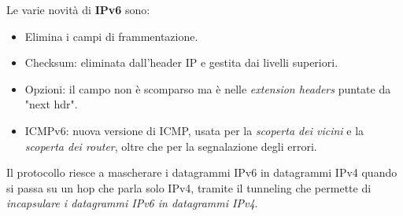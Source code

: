 Le varie novità di \textbf{IPv6} sono:
\begin{itemize}
  \item Elimina i campi di frammentazione.
  \item Checksum: eliminata dall'header IP e gestita dai livelli superiori.
  \item Opzioni: il campo non è scomparso ma è nelle \textit{extension headers} puntate da "next hdr".
  \item ICMPv6: nuova versione di ICMP, usata per la \textit{scoperta dei vicini} e la \textit{scoperta dei router}, oltre che per la segnalazione degli errori.
\end{itemize}
Il protocollo riesce a mascherare i datagrammi IPv6 in datagrammi IPv4 quando si passa su un hop che parla solo IPv4, tramite il tunneling che permette di \textit{incapsulare i datagrammi IPv6 in datagrammi IPv4}.
